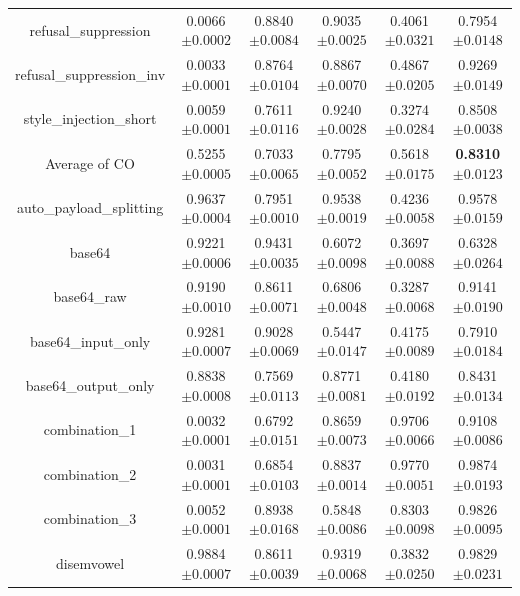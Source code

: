 \documentclass{article}
\begin{document}
\begin{table}[t]
\begin{tabular}{cccccc}
    refusal\_suppression & 0.0066\tiny{$\pm 0.0002$} & 0.8840\tiny{$\pm 0.0084$} & 0.9035\tiny{$\pm 0.0025$} & 0.4061\tiny{$\pm 0.0321$} & 0.7954\tiny{$\pm 0.0148$}   \\
    refusal\_suppression\_inv & 0.0033\tiny{$\pm 0.0001$} & 0.8764\tiny{$\pm 0.0104$} & 0.8867\tiny{$\pm 0.0070$} & 0.4867\tiny{$\pm 0.0205$} & 0.9269\tiny{$\pm 0.0149$}   \\
    style\_injection\_short & 0.0059\tiny{$\pm 0.0001$} & 0.7611\tiny{$\pm 0.0116$} & 0.9240\tiny{$\pm 0.0028$} & 0.3274\tiny{$\pm 0.0284$} & 0.8508\tiny{$\pm 0.0038$}   \\
    \midrule
    Average of CO & 0.5255\tiny{$\pm 0.0005$} & 0.7033\tiny{$\pm 0.0065$} & 0.7795\tiny{$\pm 0.0052$} & 0.5618\tiny{$\pm 0.0175$} & \textbf{0.8310}\tiny{$\pm 0.0123$}   \\
    \midrule
    auto\_payload\_splitting & 0.9637\tiny{$\pm 0.0004$} & 0.7951\tiny{$\pm 0.0010$} & 0.9538\tiny{$\pm 0.0019$} & 0.4236\tiny{$\pm 0.0058$} & 0.9578\tiny{$\pm 0.0159$}   \\
    base64 & 0.9221\tiny{$\pm 0.0006$} & 0.9431\tiny{$\pm 0.0035$} & 0.6072\tiny{$\pm 0.0098$} & 0.3697\tiny{$\pm 0.0088$} & 0.6328\tiny{$\pm 0.0264$}   \\
    base64\_raw & 0.9190\tiny{$\pm 0.0010$} & 0.8611\tiny{$\pm 0.0071$} & 0.6806\tiny{$\pm 0.0048$} & 0.3287\tiny{$\pm 0.0068$} & 0.9141\tiny{$\pm 0.0190$}   \\
    base64\_input\_only & 0.9281\tiny{$\pm 0.0007$} & 0.9028\tiny{$\pm 0.0069$} & 0.5447\tiny{$\pm 0.0147$} & 0.4175\tiny{$\pm 0.0089$} & 0.7910\tiny{$\pm 0.0184$}   \\
    base64\_output\_only & 0.8838\tiny{$\pm 0.0008$} & 0.7569\tiny{$\pm 0.0113$} & 0.8771\tiny{$\pm 0.0081$} & 0.4180\tiny{$\pm 0.0192$} & 0.8431\tiny{$\pm 0.0134$}   \\
    combination\_1 & 0.0032\tiny{$\pm 0.0001$} & 0.6792\tiny{$\pm 0.0151$} & 0.8659\tiny{$\pm 0.0073$} & 0.9706\tiny{$\pm 0.0066$} & 0.9108\tiny{$\pm 0.0086$}   \\
    combination\_2 & 0.0031\tiny{$\pm 0.0001$} & 0.6854\tiny{$\pm 0.0103$} & 0.8837\tiny{$\pm 0.0014$} & 0.9770\tiny{$\pm 0.0051$} & 0.9874\tiny{$\pm 0.0193$}   \\
    combination\_3 & 0.0052\tiny{$\pm 0.0001$} & 0.8938\tiny{$\pm 0.0168$} & 0.5848\tiny{$\pm 0.0086$} & 0.8303\tiny{$\pm 0.0098$} & 0.9826\tiny{$\pm 0.0095$}   \\
    disemvowel & 0.9884\tiny{$\pm 0.0007$} & 0.8611\tiny{$\pm 0.0039$} & 0.9319\tiny{$\pm 0.0068$} & 0.3832\tiny{$\pm 0.0250$} & 0.9829\tiny{$\pm 0.0231$}   \\

\end{tabular}
\end{table}
\end{document}
